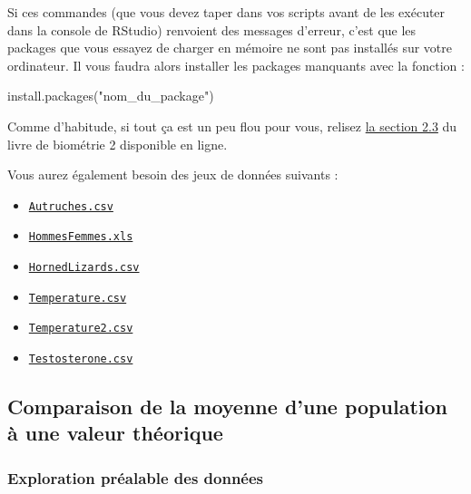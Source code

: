 \documentclass[
  a4paper,
]{article}
\newenvironment{Shaded}{\begin{snugshade}}{\end{snugshade}}
\newcommand{\FunctionTok}[1]{\textcolor[rgb]{0.39,0.29,0.61}{#1}}
\newcommand{\NormalTok}[1]{\textcolor[rgb]{0.12,0.11,0.11}{#1}}
\newcommand{\StringTok}[1]{\textcolor[rgb]{0.75,0.01,0.01}{#1}}
\providecommand{\tightlist}{%
  \setlength{\itemsep}{0pt}\setlength{\parskip}{0pt}}
\begin{document}
Si ces commandes (que vous devez taper dans vos scripts avant de les exécuter dans la console de RStudio) renvoient des messages d'erreur, c'est que les packages que vous essayez de charger en mémoire ne sont pas installés sur votre ordinateur. Il vous faudra alors installer les packages manquants avec la fonction :

\begin{Shaded}
\begin{Highlighting}[]
\FunctionTok{install.packages}\NormalTok{(}\StringTok{"nom\_du\_package"}\NormalTok{)}
\end{Highlighting}
\end{Shaded}

Comme d'habitude, si tout ça est un peu flou pour vous, relisez \href{https://besibo.github.io/Biometrie2/bases.html\#charger-un-package-en-memoire}{la section 2.3} du livre de biométrie 2 disponible en ligne.

Vous aurez également besoin des jeux de données suivants :

\begin{itemize}
\tightlist
\item
  \href{https://besibo.github.io/Biometrie3/data/Autruches.csv}{\texttt{Autruches.csv}}
\item
  \href{https://besibo.github.io/Biometrie3/data/HommesFemmes.xls}{\texttt{HommesFemmes.xls}}
\item
  \href{https://besibo.github.io/Biometrie3/data/HornedLizards.csv}{\texttt{HornedLizards.csv}}
\item
  \href{https://besibo.github.io/Biometrie3/data/Temperature.csv}{\texttt{Temperature.csv}}
\item
  \href{https://besibo.github.io/Biometrie3/data/Temperature2.csv}{\texttt{Temperature2.csv}}
\item
  \href{https://besibo.github.io/Biometrie3/data/Testosterone.csv}{\texttt{Testosterone.csv}}
\end{itemize}

\hypertarget{comparaison-de-la-moyenne-dune-population-uxe0-une-valeur-thuxe9orique}{%
\subsection{Comparaison de la moyenne d'une population à une valeur théorique}\label{comparaison-de-la-moyenne-dune-population-uxe0-une-valeur-thuxe9orique}}

\hypertarget{Explo}{%
\subsubsection{Exploration préalable des données}\label{Explo}}
\end{document}
